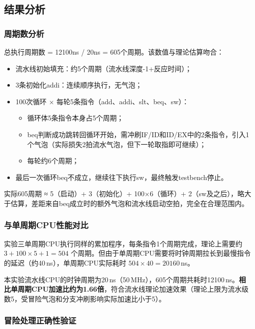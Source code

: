 \subsection{结果分析}

\subsubsection{周期数分析}

总执行周期数 = 12100ns / 20ns = 605个周期。该数值与理论估算吻合：

\begin{itemize}
    \item 流水线初始填充：约5个周期（流水线深度-1+反应时间）；
    \item 3条初始化addi：连续顺序执行，无气泡；
    \item 100次循环 × 每轮5条指令（add、addi、slt、beq、sw）：
    \begin{itemize}
        \item 循环体5条指令本身占5个周期；
        \item beq判断成功跳转回循环开始，需冲刷IF/ID和ID/EX中的2条指令，引入1个气泡（实际损失2拍流水气泡，但下一轮取指即可继续）；
        \item 每轮约6个周期；
    \end{itemize}
    \item 最后一次循环beq不成立，继续往下执行sw，最终触发testbench停止。
\end{itemize}

实际605周期 ≈ 5（启动）+ 3（初始化）+ 100×6（循环）+ 2（sw及之后），略大于估算，差距来自beq成立时的额外气泡和流水线启动空拍，完全在合理范围内。

\subsubsection{与单周期CPU性能对比}

实验三单周期CPU执行同样的累加程序，每条指令1个周期完成，理论上需要约 $3 + 100 \times 5 + 1 = 504$ 个周期。但由于单周期CPU需要将时钟周期拉长到最慢指令的延迟（约40\,ns），单周期CPU实际耗时 $504 \times 40 = 20160$\,ns。

本实验流水线CPU的时钟周期为20\,ns（50\,MHz），605个周期共耗时12100\,ns。\textbf{相比单周期CPU加速比约为1.66倍}，符合流水线理论加速效果（理论上限为流水级数5，受冒险气泡和分支冲刷影响实际加速比小于5）。

\subsubsection{冒险处理正确性验证}

